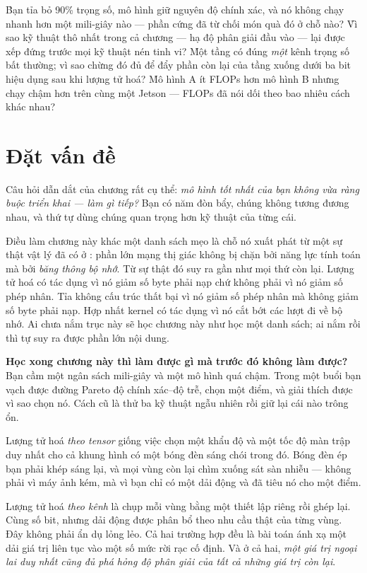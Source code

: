 \documentclass[../../deep_learning.tex]{subfiles}
\begin{document}
\begin{khoigoi}
\h{Bạn tỉa bỏ 90\% trọng số, mô hình giữ nguyên độ chính xác, và nó không chạy nhanh hơn một mili-giây nào --- phần cứng đã từ chối món quà đó ở chỗ nào?}
\h{Vì sao kỹ thuật thô nhất trong cả chương --- hạ độ phân giải đầu vào --- lại được xếp đứng trước mọi kỹ thuật nén tinh vi?}
\h{Một tầng có đúng \emph{một} kênh trọng số bất thường; vì sao chừng đó đủ để đẩy phần còn lại của tầng xuống dưới ba bit hiệu dụng sau khi lượng tử hoá?}
\h{Mô hình A ít FLOPs hơn mô hình B nhưng chạy chậm hơn trên cùng một Jetson --- FLOPs đã nói dối theo bao nhiêu cách khác nhau?}
\end{khoigoi}

\section{Đặt vấn đề}
Câu hỏi dẫn dắt của chương rất cụ thể: \emph{mô hình tốt nhất của bạn không vừa ràng buộc triển khai --- làm gì tiếp?} Bạn có năm đòn bẩy, chúng không tương đương nhau, và thứ tự dùng chúng quan trọng hơn kỹ thuật của từng cái.

Điều làm chương này khác một danh sách mẹo là chỗ nó xuất phát từ một sự thật vật lý đã có ở : phần lớn mạng thị giác không bị chặn bởi năng lực tính toán mà bởi \emph{băng thông bộ nhớ}. Từ sự thật đó suy ra gần như mọi thứ còn lại. Lượng tử hoá có tác dụng vì nó giảm số byte phải nạp chứ không phải vì nó giảm số phép nhân. Tỉa không cấu trúc thất bại vì nó giảm số phép nhân mà không giảm số byte phải nạp. Hợp nhất kernel có tác dụng vì nó cắt bớt các lượt đi về bộ nhớ. Ai chưa nắm trục này sẽ học chương này như học một danh sách; ai nắm rồi thì tự suy ra được phần lớn nội dung.


\textbf{Học xong chương này thì làm được gì mà trước đó không làm được?} Bạn cầm một ngân sách mili-giây và một mô hình quá chậm. Trong một buổi bạn vạch được đường Pareto độ chính xác--độ trễ, chọn một điểm, và giải thích được vì sao chọn nó. Cách cũ là thử ba kỹ thuật ngẫu nhiên rồi giữ lại cái nào trông ổn.

\begin{trucgiac}
Lượng tử hoá \emph{theo tensor} giống việc chọn một khẩu độ và một tốc độ màn trập duy nhất cho cả khung hình có một bóng đèn sáng chói trong đó. Bóng đèn ép bạn phải khép sáng lại, và mọi vùng còn lại chìm xuống sát sàn nhiễu --- không phải vì máy ảnh kém, mà vì bạn chỉ có một dải động và đã tiêu nó cho một điểm.

Lượng tử hoá \emph{theo kênh} là chụp mỗi vùng bằng một thiết lập riêng rồi ghép lại. Cùng số bit, nhưng dải động được phân bổ theo nhu cầu thật của từng vùng. Đây không phải ẩn dụ lỏng lẻo. Cả hai trường hợp đều là bài toán ánh xạ một dải giá trị liên tục vào một số mức rời rạc cố định. Và ở cả hai, \emph{một giá trị ngoại lai duy nhất cũng đủ phá hỏng độ phân giải của tất cả những giá trị còn lại}.
\end{trucgiac}
\end{document}
